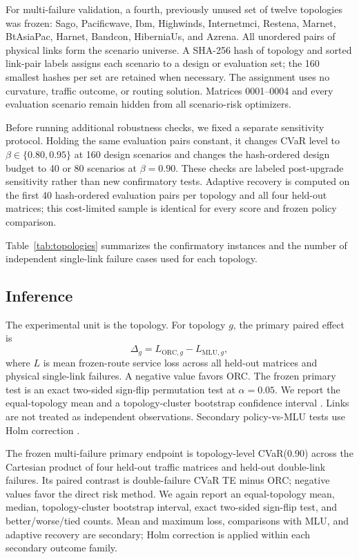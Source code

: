 \documentclass[preprint,12pt]{elsarticle}
\begin{document}
For multi-failure validation, a fourth, previously unused set of twelve
topologies was frozen: Sago, Pacificwave, Ibm, Highwinds, Internetmci, Restena,
Marnet, BtAsiaPac, Harnet, Bandcon, HiberniaUs, and Azrena. All unordered pairs
of physical links form the scenario universe. A SHA-256 hash of topology and
sorted link-pair labels assigns each scenario to a design or evaluation set;
the 160 smallest hashes per set are retained when necessary. The assignment
uses no curvature, traffic outcome, or routing solution. Matrices 0001--0004
and every evaluation scenario remain hidden from all scenario-risk optimizers.

Before running additional robustness checks, we fixed a separate sensitivity
protocol. Holding the same evaluation pairs constant, it changes CVaR level to
$\beta\in\{0.80,0.95\}$ at 160 design scenarios and changes the hash-ordered
design budget to 40 or 80 scenarios at $\beta=0.90$. These checks are labeled
post-upgrade sensitivity rather than new confirmatory tests. Adaptive recovery
is computed on the first 40 hash-ordered evaluation pairs per topology and all
four held-out matrices; this cost-limited sample is identical for every score
and frozen policy comparison.

Table~\ref{tab:topologies} summarizes the confirmatory instances and the number
of independent single-link failure cases used for each topology.



\subsection{Inference}

The experimental unit is the topology. For topology $g$, the primary paired
effect is
\begin{equation}
 \Delta_g=L_{\mathrm{ORC},g}-L_{\mathrm{MLU},g},
\end{equation}
where $L$ is mean frozen-route service loss across all held-out matrices and
physical single-link failures. A negative value favors ORC. The frozen primary
test is an exact two-sided sign-flip permutation test at $\alpha=0.05$.
We report the equal-topology mean and a topology-cluster bootstrap confidence
interval \cite{efron1979bootstrap}. Links are not treated as independent
observations. Secondary policy-vs-MLU tests use Holm correction
\cite{holm1979}.

The frozen multi-failure primary endpoint is topology-level CVaR(0.90) across
the Cartesian product of four held-out traffic matrices and held-out
double-link failures. Its paired contrast is double-failure CVaR TE minus ORC;
negative values favor the direct risk method. We again report an equal-topology
mean, median, topology-cluster bootstrap interval, exact two-sided sign-flip
test, and better/worse/tied counts. Mean and maximum loss, comparisons with MLU,
and adaptive recovery are secondary; Holm correction is applied within each
secondary outcome family.
\end{document}
